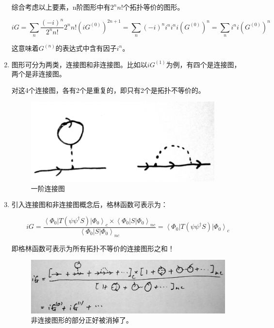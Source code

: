 \begin{enumerate}
综合考虑以上要素，n阶图形中有$2^n n!$个拓扑等价的图形。

\begin{equation*}
i G = \sum\limits_n \frac{ (-i)^n  }{ 2^n n!  } 2^n n! ( iG^{(0)} )^{2n + 1} = \sum\limits_n (-i)^n i^n i^n i (G^{(0)})^n = \sum\limits_n i^n i ( G^{(0)} )^n
\end{equation*}

这意味着$G^{(n)}$的表达式中含有因子$i^n$。


\item 

图形可分为两类，连接图和非连接图。比如以$i G^{(1)}$为例，有四个是连接图，两个是非连接图。

对这4个连接图，各有2个是重复的，即只有2个是拓扑不等价的。

\begin{figure}[htbp]
\begin{center}
\includegraphics[width=10cm]{Zero/1stFDiagram.jpg}
\caption{一阶连接图}
\end{center}
\end{figure}

\item

引入连接图和非连接图概念后，格林函数可表示为：

\begin{equation}
iG = \frac{\left\langle \Phi_0 \right| T ( \psi \psi^\dagger S ) \left| \Phi_0  \right\rangle_c \times \left\langle \Phi_0 \right|  S  \left| \Phi_0 \right\rangle_{nc}}{ \left\langle \Phi_0 \right|  S  \left| \Phi_0 \right\rangle_{nc}} = \left\langle \Phi_0 \right| T ( \psi \psi^\dagger S ) \left| \Phi_0 \right\rangle_c
\end{equation}

即格林函数可表示为所有拓扑不等价的连接图形之和！

\begin{figure}[htbp]
\begin{center}
\includegraphics[width=11cm]{Zero/FDconnected.jpg}
\caption{非连接图形的部分正好被消掉了。}
\end{center}
\end{figure}


\end{enumerate}
